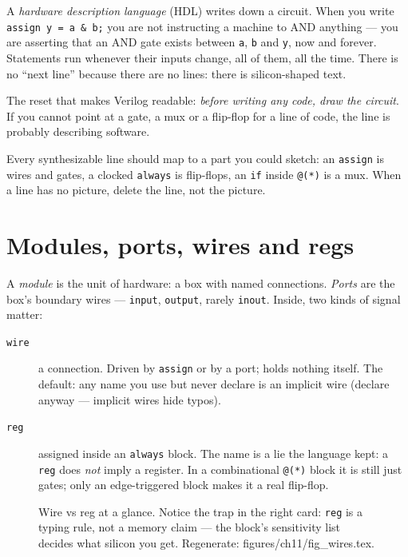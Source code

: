  A \emph{hardware description language} (HDL)
writes down a circuit. When you write \texttt{assign y = a \& b;} you
are not instructing a machine to AND anything --- you are asserting
that an AND gate exists between \texttt{a}, \texttt{b} and \texttt{y},
now and forever. Statements run whenever their inputs change, all of
them, all the time. There is no ``next line'' because there are no
lines: there is silicon-shaped text.

The reset that makes Verilog readable: \emph{before writing any code,
draw the circuit}. If you cannot point at a gate, a mux or a flip-flop
for a line of code, the line is probably describing software.

\begin{principle}
Every synthesizable line should map to a part you could sketch:
an \texttt{assign} is wires and gates, a clocked \texttt{always} is
flip-flops, an \texttt{if} inside \texttt{@(*)} is a mux. When a line
has no picture, delete the line, not the picture.
\end{principle}

\section{Modules, ports, wires and regs}\label{sec:ports}

A \emph{module} is the unit of hardware: a box
with named connections. \emph{Ports} are the box's
boundary wires --- \texttt{input}, \texttt{output}, rarely
\texttt{inout}. Inside, two kinds of signal matter:

\begin{description}
\item[\texttt{wire}] a connection. Driven by \texttt{assign} or by a
port; holds nothing itself. The default: any name you use but never
declare is an implicit wire (declare anyway --- implicit wires hide
typos).
\item[\texttt{reg}] assigned inside an \texttt{always} block. The name
is a lie the language kept: a \texttt{reg} does \emph{not} imply a
register. In a combinational \texttt{@(*)} block it is still just
gates; only an edge-triggered block makes it a real flip-flop.
\end{description}

\begin{figure}[htbp]
\centering

\caption{Wire vs reg at a glance. Notice the trap in the right card:
\texttt{reg} is a typing rule, not a memory claim --- the block's
sensitivity list decides what silicon you get. Regenerate:
\ttfamily figures/ch11/fig\_wires.tex.}
\label{fig:wires}
\end{figure}

